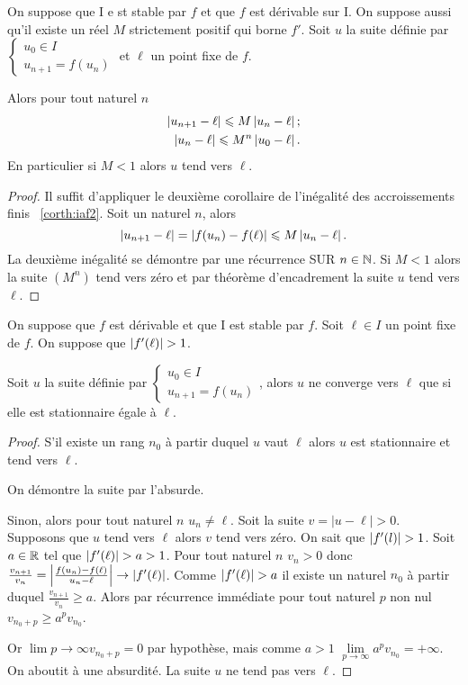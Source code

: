 \begin{prop}
  On suppose que I e st stable par \(f\) et que \(f\) est dérivable sur I. On 
  suppose aussi qu'il existe un réel \(M\) strictement positif qui borne \(f'\). 
  Soit \(u\) la suite définie par \(\begin{cases} u_0 \in I \\ u_{n+1}=f(u_n) 
  \end{cases}\) et \(\ell\) un point fixe de \(f\).

  Alors pour tout naturel \(n\)
  \begin{align}
    \left\lvert u_{n+1}-\ell\right\rvert \leqslant M \left\lvert u_n-\ell\right\rvert; \\
    \left\lvert u_n-\ell\right\rvert \leqslant M^n \left\lvert u_0-\ell\right\rvert.
  \end{align}
  En particulier si \(M < 1\) alors \(u\) tend vers \(\ell\).
\end{prop}
\begin{proof}
  Il suffit d'appliquer le deuxième corollaire de l'inégalité des accroissements 
  finis~
  \ref{corth:iaf2}. Soit un naturel \(n\), alors
  \begin{equation}
    \left\lvert u_{n+1}-\ell\right\rvert=\left\lvert f(u_n)-f(\ell)\right\rvert \leqslant M \left\lvert u_n-\ell\right\rvert.
  \end{equation}
  La deuxième inégalité se démontre par une récurrence SUR \(n \in \mathbb{N}\). Si 
  \(M<1\) alors la suite \((M^n)\) tend vers zéro et par théorème d'encadrement 
  la suite \(u\) tend vers \(\ell\).
\end{proof}
\begin{prop}
  On suppose que \(f\) est dérivable et que I est stable par \(f\). Soit \(\ell 
  \in I\) un point fixe de \(f\). On suppose que \(\left\lvert f'(\ell)\right\rvert>1\).

  Soit \(u\) la suite définie par \(\begin{cases} u_0 \in I \\ u_{n+1}=f(u_n) 
  \end{cases}\), alors \(u\) ne converge vers \(\ell\) que si elle est 
  stationnaire égale à \(\ell\).
\end{prop}
\begin{proof}
  S'il existe un rang \(n_0\) à partir duquel \(u\) vaut \(\ell\) alors \(u\) 
  est stationnaire et tend vers \(\ell\).

  On démontre la suite par l'absurde.

  Sinon, alors pour tout naturel \(n\) \(u_n \neq \ell\). Soit la suite 
  \(v=|u-\ell|>0\). Supposons que \(u\) tend vers \(\ell\) alors \(v\) tend vers 
  zéro. On sait que \(\left\lvert f'(l)\right\rvert>1\). Soit \(a \in \mathbb{R}\) tel que 
  \(\left\lvert f'(\ell)\right\rvert>a>1\). Pour tout naturel \(n\) \(v_n>0\) donc 
  \(\frac{v_{n+1}}{v_n} = \left\lvert\frac{f(u_n)-f(\ell)}{u_n-\ell}\right\rvert \to 
  \left\lvert f'(\ell)\right\rvert\). Comme \(\left\lvert f'(\ell)\right\rvert>a\) il existe un naturel \(n_0\) à 
  partir duquel \(\frac{v_{n+1}}{v_n} \geqslant a\). Alors par récurrence 
  immédiate pour tout naturel \(p\) non nul \(v_{n_0+p} \geqslant a^p v_{n_0}\).

  Or \(\lim\limits{p \to \infty} v_{n_0+p} = 0\) par hypothèse, mais comme \(a 
  >1\) \(\lim\limits_{p \to \infty} a^p v_{n_0}= + \infty\). On aboutit à une 
  absurdité. La suite \(u\) ne tend pas vers \(\ell\).
\end{proof}

